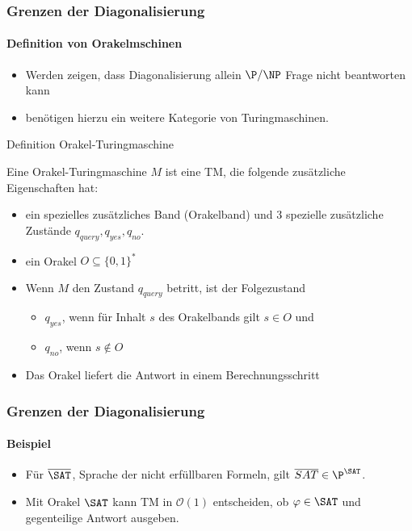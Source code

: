 \begin{frame}
	\frametitle{Grenzen der Diagonalisierung}
	\framesubtitle{Definition von Orakelmschinen}
	\begin{itemize}
		\item Werden zeigen, dass Diagonalisierung allein $\P/\NP$ Frage nicht beantworten kann
		\item benötigen hierzu ein weitere Kategorie von Turingmaschinen. 
	\end{itemize}
	\begin{KITinfoblock}{Definition Orakel-Turingmaschine} {
			Eine Orakel-Turingmaschine $M$ ist eine TM, die folgende zusätzliche Eigenschaften hat:
			\begin{itemize}
				\item<2-> ein spezielles zusätzliches Band (Orakelband) und 3 spezielle zusätzliche Zustände $q_{query}, q_{yes}, q_{no}$.
				\item <3-> ein Orakel $O \subseteq \{0,1\}^*$
				\item <4-> Wenn $M$ den Zustand $q_{query}$ betritt, ist der Folgezustand
					\begin{itemize}
					\item $q_{yes}$, wenn für Inhalt $s$ des Orakelbands gilt $s \in O$ und
				    \item	$q_{no}$, wenn  $s \notin O$ 
					\end{itemize} 
				\item<5-> Das Orakel liefert die Antwort \alert{in einem Berechnungsschritt}
			\end{itemize}
		}
	\end{KITinfoblock}
\end{frame}
\begin{frame} 
	\frametitle{Grenzen der Diagonalisierung}
	\framesubtitle{Beispiel}
	\heading{$\overline{\SAT}$}
	\begin{itemize}[<+->]
		\item   Für $\overline{\SAT}$, Sprache der nicht erfüllbaren Formeln, gilt
		$\overline{SAT} \in {\P}^{\SAT}$.
		\item   Mit  Orakel $\SAT$ kann TM in $\mathcal{O}(1)$ entscheiden, ob
		$\varphi \in \SAT$ und gegenteilige Antwort ausgeben.
	\end{itemize}
	
\end{frame}
